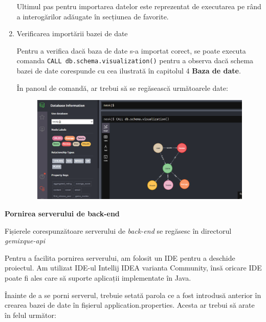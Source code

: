 \documentclass[12pt,a4paper]{report}
\begin{document}
\begin{enumerate}
Ultimul pas pentru importarea datelor este reprezentat de executarea pe rând a interogărilor adăugate în secțiunea de favorite.
  
  
  \item Verificarea importării bazei de date
  
  Pentru a verifica dacă baza de date s-a importat corect, se poate executa comanda \texttt{CALL db.schema.visualization()} pentru a observa dacă schema bazei de date corespunde cu cea ilustrată în capitolul 4 \textbf{Baza de date}.

În panoul de comandă, ar trebui să se regăsească următoarele date:

        \begin{figure}[H]
\centering
\caption{}
\begin{adjustbox}{max size={\textwidth}{\textheight}}
\includegraphics[scale=0.6]{exemplu_48_verificare}
\end{adjustbox}
\caption*{}
\end{figure}
  
  
\end{enumerate}

\bigskip
\textbf{Pornirea serverului de back-end}
\bigskip

Fișierele corespunzătoare serverului de \emph{back-end} se regăsesc în directorul \emph{gemixque-api}

Pentru a facilita pornirea serverului, am folosit un IDE pentru a deschide proiectul. Am utilizat IDE-ul Intellij IDEA varianta Community, însă oricare IDE poate fi ales care să suporte aplicații implementate în Java.

Înainte de a se porni serverul, trebuie setată parola ce a fost introdusă anterior în crearea bazei de date în fișierul application.properties. Acesta ar trebui să arate în felul următor:
\end{document}

